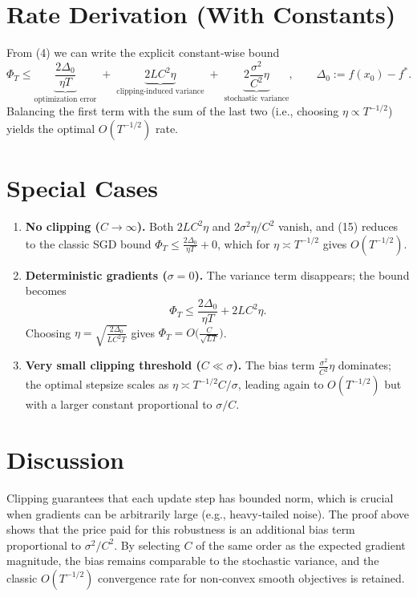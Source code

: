 \documentclass[11pt]{article}
\begin{document}
\section*{Rate Derivation (With Constants)}
From (4) we can write the explicit constant‑wise bound
\[
\Phi_T \le
\underbrace{\frac{2\Delta_0}{\eta T}}_{\text{optimization error}}
\;+\;
\underbrace{2LC^{2}\eta}_{\text{clipping‑induced variance}}
\;+\;
\underbrace{2\frac{\sigma^{2}}{C^{2}}\eta}_{\text{stochastic variance}},
\qquad \Delta_0:=f(x_0)-f^{*}.
\tag{15}
\]
Balancing the first term with the sum of the last two (i.e., choosing $\eta\propto T^{-1/2}$) yields the optimal $O(T^{-1/2})$ rate.

\section*{Special Cases}
\begin{enumerate}[label=\alph*)]
\item \textbf{No clipping ($C\to\infty$).}  
Both $2LC^{2}\eta$ and $2\sigma^{2}\eta/C^{2}$ vanish, and (15) reduces to the classic SGD bound $\displaystyle\Phi_T\le \frac{2\Delta_0}{\eta T}+0$, which for $\eta\asymp T^{-1/2}$ gives $O(T^{-1/2})$.

\item \textbf{Deterministic gradients ($\sigma=0$).}  
The variance term disappears; the bound becomes
\[
\Phi_T \le \frac{2\Delta_0}{\eta T}+2LC^{2}\eta .
\]
Choosing $\eta = \sqrt{\frac{2\Delta_0}{LC^{2}T}}$ gives $\Phi_T = O\!\big(\frac{C}{\sqrt{LT}}\big)$.

\item \textbf{Very small clipping threshold ($C\ll\sigma$).}  
The bias term $\frac{\sigma^{2}}{C^{2}}\eta$ dominates; the optimal stepsize scales as $\eta\asymp T^{-1/2}C/\sigma$, leading again to $O(T^{-1/2})$ but with a larger constant proportional to $\sigma/C$.
\end{enumerate}

\section*{Discussion}
Clipping guarantees that each update step has bounded norm, which is crucial when gradients can be arbitrarily large (e.g., heavy‑tailed noise).  
The proof above shows that the price paid for this robustness is an additional bias term proportional to $\sigma^{2}/C^{2}$. By selecting $C$ of the same order as the expected gradient magnitude, the bias remains comparable to the stochastic variance, and the classic $O(T^{-1/2})$ convergence rate for non‑convex smooth objectives is retained.
\end{document}

